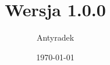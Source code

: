\documentclass[a4paper,12pt]{report}
\newcommand\chapterdir{chapters}
\begin{document}
	\title{\kosmoramus\\{\small Wersja 1.0.0}}
	\author{Antyradek}
	\date{\today}
	\maketitle
	\tableofcontents
	
	
	
	
	
	
\end{document}
